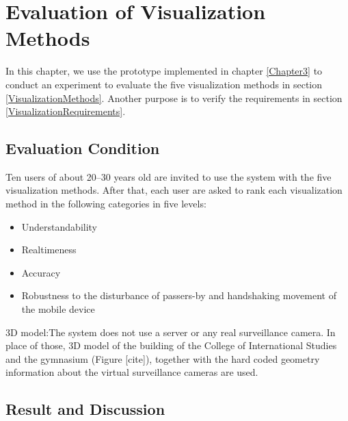 \chapter{Evaluation of Visualization Methods}
\label{Chapter4}

In this chapter, we use the prototype implemented in chapter \ref{Chapter3} to conduct an experiment to evaluate the five visualization methods in section \ref{VisualizationMethods}. Another purpose is to verify the requirements in section \ref{VisualizationRequirements}.


\section{Evaluation Condition}

Ten users of about 20--30 years old are invited to use the system with the five visualization methods. After that, each user are asked to rank each visualization method in the following categories in five levels:

\begin{itemize}
	\item Understandability
	\item Realtimeness
	\item Accuracy
	\item Robustness to the disturbance of passers-by and handshaking movement of the mobile device
\end{itemize}

3D model:The system does not use a server or any real surveillance camera. In place of those, 3D model of the building of the College of International Studies and the gymnasium (Figure [cite]), together with the hard coded geometry information about the virtual surveillance cameras are used.


\section{Result and Discussion}

